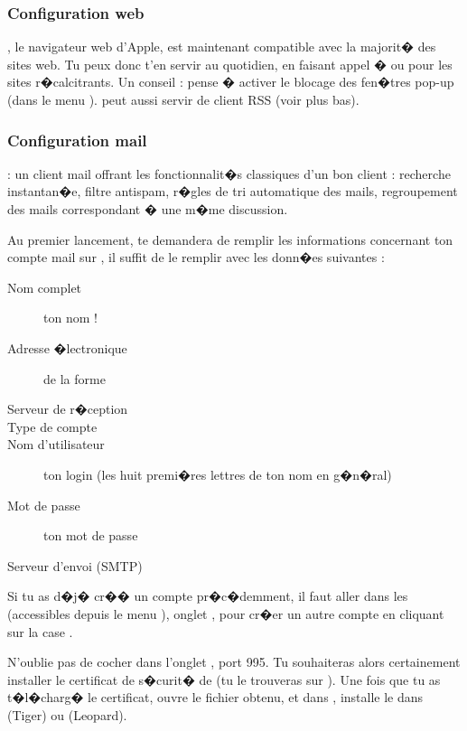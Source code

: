 \subsubsection{Configuration web}

 , le
navigateur web d'Apple, est maintenant compatible avec la majorit�
des sites web. Tu peux donc t'en servir au quotidien, en faisant
appel �  ou  pour les sites r�calcitrants.
Un conseil : pense � activer le blocage des fen�tres pop-up (dans le menu ).  peut aussi servir de client RSS (voir plus bas).\\

\subsubsection{Configuration mail}

  : un client mail offrant les fonctionnalit�s classiques d'un bon client : recherche instantan�e,
filtre antispam, r�gles de tri automatique des mails, regroupement des mails correspondant � une m�me discussion.

Au premier lancement,  te demandera de remplir les
informations concernant ton compte mail sur , il suffit
de le remplir avec les donn�es suivantes :

\begin{description}
  \item[Nom complet] ton nom !
  \item[Adresse �lectronique] de la forme 
  \item[Serveur de r�ception] 
  \item[Type de compte] 
  \item[Nom d'utilisateur] ton login  (les huit premi�res lettres de ton nom en g�n�ral)
  \item[Mot de passe] ton mot de passe 
  \item[Serveur d'envoi (SMTP)] 
\end{description}

Si tu as d�j� cr�� un compte pr�c�demment, il faut aller dans les
 (accessibles depuis le menu ), onglet
, pour cr�er un autre compte en cliquant sur la case
\menu{+}.

N'oublie pas de cocher  dans l'onglet , port 995. Tu
souhaiteras alors certainement installer le certificat de s�curit� de  (tu le
trouveras sur ). Une fois que tu as t�l�charg� le certificat, ouvre le
fichier  obtenu, et dans , installe le dans  (Tiger) ou  (Leopard).

